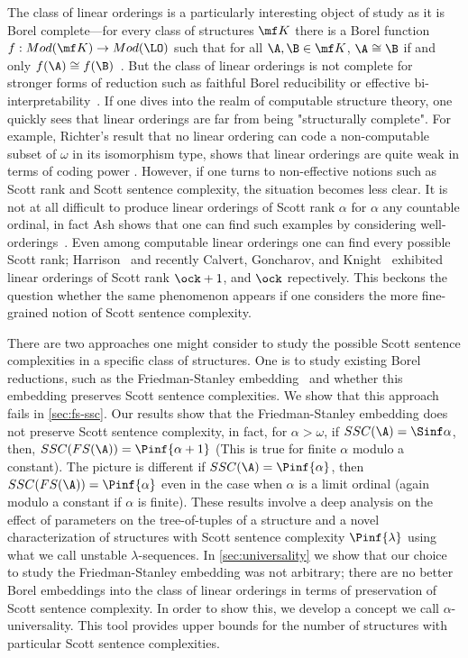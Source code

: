 \documentclass{amsart}
\begin{document}
The class of linear orderings is a particularly interesting object of study as
it is Borel complete---for every class of structures $\mf K$ there is a
Borel function $f:Mod(\mf K)\to Mod(\LO)$ such that for all $\A,\B\in \mf K$,
$\A\cong \B$ if and only $f(\A)\cong f(\B)$~\cite{friedman1989}.
But the class of linear orderings is not complete for stronger forms of reduction such as faithful Borel
reducibility or effective bi-interpretability~\cite{gao2001}. 
If one dives into the realm of computable structure theory, one quickly sees
that linear orderings are far from being "structurally complete". For example,
Richter's result that no linear ordering can code a non-computable subset
of $\omega$ in its isomorphism type, shows that linear orderings are quite weak
in terms of coding power \cite{Ric81}. However, if one turns to non-effective notions such as Scott
rank and Scott sentence complexity, the situation becomes less clear. It is not
at all difficult to produce linear orderings of Scott rank $\alpha$ for $\alpha$
any countable ordinal, in fact Ash shows that one can find such examples by
considering well-orderings~\cite{ash1986}. Even among computable linear
orderings one can find every possible Scott rank; Harrison~\cite{harrison1968} and recently
Calvert, Goncharov, and Knight~\cite{calvert2007} exhibited linear orderings of
Scott rank $\ock+1$, and $\ock$ repectively. This beckons the question whether the
same phenomenon appears if one considers the more fine-grained notion of Scott
sentence complexity.

There are two approaches one might consider to study the possible Scott sentence
complexities in a specific class of structures. One is to study existing
Borel reductions, such as the Friedman-Stanley embedding~\cite{friedman1989} and
whether this embedding preserves Scott sentence complexities. We show that this
approach fails in \cref{sec:fs-ssc}. Our results
show that the Friedman-Stanley embedding does not preserve Scott sentence
complexity, in fact, for $\alpha>\omega$, if $SSC(\A)=\Sinf\alpha$, then,
$SSC(FS(\A))=\Pinf{\alpha+1}$ (This is true for finite $\alpha$ modulo a
constant). The picture is different if $SSC(\A)=\Pinf{\alpha}$, then
$SSC(FS(\A))=\Pinf{\alpha}$ even in the case when $\alpha$ is a limit ordinal
(again modulo a constant if $\alpha$ is finite). These results involve a deep
analysis on the effect of parameters on the tree-of-tuples of a structure and
a novel characterization of structures with Scott sentence complexity
$\Pinf{\lambda}$ using what we call unstable $\lambda$-sequences. 
In \cref{sec:universality} we show that our choice to study the Friedman-Stanley
embedding was not arbitrary; there are no better Borel embeddings into the class
of linear orderings in terms of preservation of Scott sentence complexity. In order to show 
this, we develop a concept we call $\alpha$-universality. This tool provides
upper bounds for the number of structures with particular Scott sentence complexities.
\end{document}
